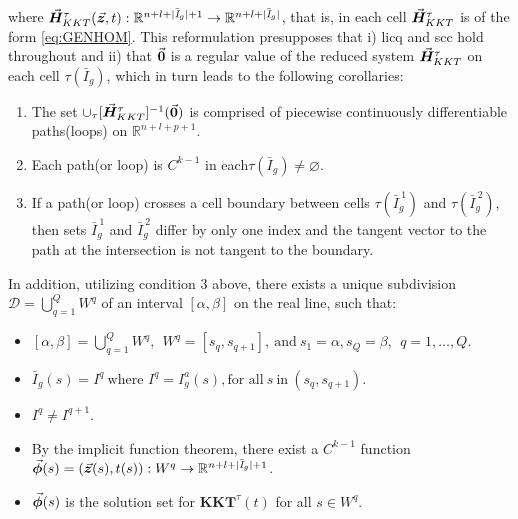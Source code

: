 where $\vec{\bm{H}}_{KKT}^{\tau}(\vec{\bm{z}},t):
\mathbb{R}^{n+l+|\bar{\mathit{I}}_g|+1}\rightarrow
\mathbb{R}^{n+l+|\bar{\mathit{I}}_g|}$, that is, in each cell 
$\vec{\bm{H}}_{KKT}^{\tau}$ is of the form \ref{eq:GENHOM}.
This reformulation presupposes that i) \acrshort{licq} and \acrshort{scc} 
hold throughout and ii) that $\vec{\bm{0}}$ is a 
regular value of the reduced system $\vec{\bm{H}}_{KKT}^{\tau}$ on each cell 
$\tau(\bar{I}_g)$, which in turn leads to the following 
corollaries\cite{Kojima:1984}:
\begin{enumerate}
	\item The set $\cup_{\tau}[\vec{\bm{H}}^{\tau}_{KKT}]^{-1}(\vec{\bm{0}})$ is 
	comprised of piecewise
	continuously differentiable paths(loops) on $\mathbb{R}^{n+l+p+1}$.
	\item Each path(or loop) is $C^{k-1}$ in each$\tau(\bar{I}_g)\neq 
	\varnothing$.
	\item If a path(or loop) crosses a cell boundary between cells
	$\tau(\bar{I}^{\ 1}_g)$ and $\tau(\bar{I}_g^{\ 2})$, then sets $\bar{I}^{\ 
	1}_g$ and $\bar{I}^{\ 2}_g$ differ by only one index and the tangent vector 
	to the 
	path at the intersection is not tangent to the boundary.
\end{enumerate}

 In addition, utilizing condition 3
above, there exists\cite{Gfrerer:1985} a unique subdivision 
$\mathcal{D}=\bigcup_{q=1}^Q W^q$ 
of an interval $[\alpha,\beta]$ on the real line, such that:
\begin{itemize}
	\item	$[\alpha,\beta]=\bigcup_{q=1}^Q W^q,\ \ W^q = 
	[s_q,s_{q+1}],\ 
	\text{and}\  s_1=\alpha, s_Q=\beta,\ \ q=1,\dots,Q$.
	\item $\bar{I}_g(s)=I^q\ \text{where } \mathit{I}^q=\mathit{I}^a_g(s),
	\text{for all}\ s\ \text{in}\ (s_q,s_{q+1})$.
	\item $I^q\neq I^{q+1}$.
	\item By the implicit function theorem, there exist a $C^{k-1}$ function 
	$\vec{\bm{\phi}}(s)=(\vec{\bm{z}}(s),t(s)):W^q\rightarrow
	\mathbb{R}^{n+l+|\bar{\mathit{I}}_g|+1}$.
	\item $\vec{\bm{\phi}}(s)$ is the solution set for
	$\textbf{KKT}^{\tau}(t)$ for all $s\in W^q$.
\end{itemize}

